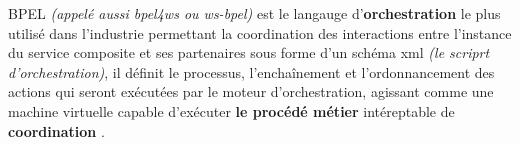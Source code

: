     
    

    \textsc{BPEL} \textit{(appelé aussi \acrshort{bpel4ws} ou
      \acrshort{ws-bpel})} est le langauge d'\textbf{orchestration}
    le plus utilisé dans l'industrie permettant la coordination des
    interactions entre l'instance du service composite et ses
    partenaires sous forme d'un schéma \acrshort{xml} \textit{(le
      scriprt d'orchestration)}, il définit le processus,
    l'enchaînement et l'ordonnancement des actions qui seront
    exécutées par le moteur d'orchestration, agissant comme une
    machine virtuelle capable d'exécuter \textbf{le procédé métier}
    intéreptable de \textbf{coordination}
    \cite{chollet2009orchestration}.






